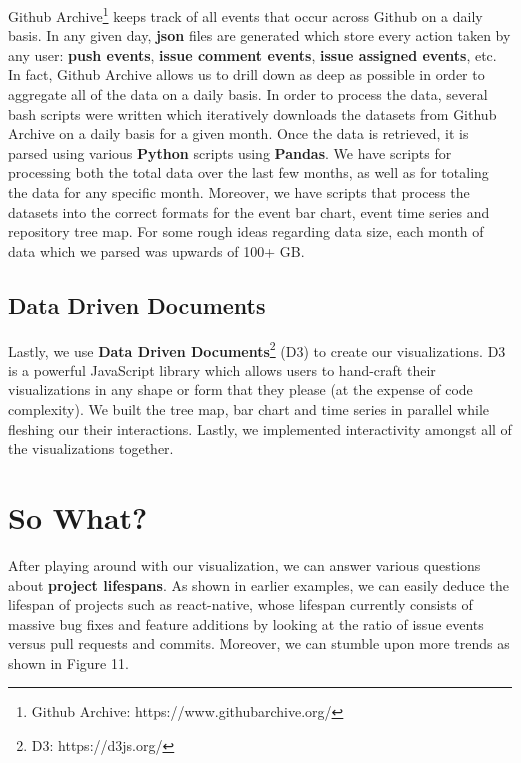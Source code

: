 \documentclass{article}
\begin{document}
Github Archive\footnote{Github Archive: https://www.githubarchive.org/} keeps track of all events that occur across Github on a daily basis. In any given day, \textbf{json} files are generated which store every action taken by any user: \textbf{push events}, \textbf{issue comment events}, \textbf{issue assigned events}, etc. In fact, Github Archive allows us to drill down as deep as possible in order to aggregate all of the data on a daily basis. In order to process the data, several bash scripts were written which iteratively downloads the datasets from Github Archive on a daily basis for a given month. Once the data is retrieved, it is parsed using various \textbf{Python} scripts using \textbf{Pandas}. We have scripts for processing both the total data over the last few months, as well as for totaling the data for any specific month. Moreover, we have scripts that process the datasets into the correct formats for the event bar chart, event time series and repository tree map. For some rough ideas regarding data size, each month of data which we parsed was upwards of 100+ GB.

\subsection {Data Driven Documents}

Lastly, we use \textbf{Data Driven Documents}\footnote{D3: https://d3js.org/} (D3) to create our visualizations. D3 is a powerful JavaScript library which allows users to hand-craft their visualizations in any shape or form that they please (at the expense of code complexity). We built the tree map, bar chart and time series in parallel while fleshing our their interactions. Lastly, we implemented interactivity amongst all of the visualizations together.

\section {So What?}

After playing around with our visualization, we can answer various questions about \textbf{project lifespans}. As shown in earlier examples, we can easily deduce the lifespan of projects such as react-native, whose lifespan currently consists of massive bug fixes and feature additions by looking at the ratio of issue events versus pull requests and commits. Moreover, we can stumble upon more trends as shown in Figure 11.

\newpage
\end{document}
